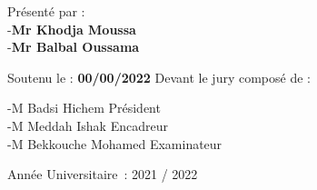 \begin{titlepage}
\begin{center}
        \vspace{0.5cm}
        
        Présenté par : \\
        -\textbf{Mr Khodja Moussa} \\
        -\textbf{Mr Balbal Oussama} \\
        	

        \vspace{0.5cm}

        Soutenu le : \textbf{00/00/2022} Devant le jury composé de :\\
    \end{center}
        -M  Badsi Hichem Président \\
        -M  Meddah Ishak Encadreur \\
        -M  Bekkouche Mohamed Examinateur \\
    
    \begin{center}
        \vfill
        Année Universitaire : 2021 / 2022
    \end{center}
\end{titlepage}
